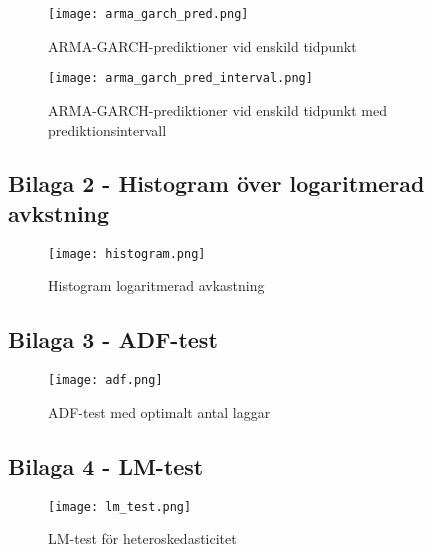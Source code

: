 \documentclass[11pt]{article}
\begin{document}
\begin{figure}[H]
\caption{ARMA-GARCH-prediktioner vid enskild tidpunkt}
\texttt{[image: arma\_garch\_pred.png]}
\centering
\end{figure}

\begin{figure}[H]
\caption{ARMA-GARCH-prediktioner vid enskild tidpunkt med prediktionsintervall}
\texttt{[image: arma\_garch\_pred\_interval.png]}
\centering
\end{figure}



\subsection{Bilaga 2 - Histogram över logaritmerad avkstning}
\begin{figure}[H]
\caption{Histogram logaritmerad avkastning}
\texttt{[image: histogram.png]}
\centering
\end{figure}


\subsection{Bilaga 3 - ADF-test}
\begin{figure}[H]
\caption{ADF-test med optimalt antal laggar}
\texttt{[image: adf.png]}
\centering
\end{figure}


\subsection{Bilaga 4 - LM-test}
\begin{figure}[H]
\caption{LM-test för heteroskedasticitet}
\texttt{[image: lm\_test.png]}
\centering
\end{figure}
\end{document}
